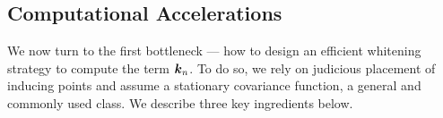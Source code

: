 \subsection{Computational Accelerations}
\label{sec:computational}
We now turn to the first bottleneck --- how to design an efficient whitening strategy
to compute the term $\boldsymbol{k}_n$. %
To do so,
we rely on judicious placement of inducing points and assume a stationary
covariance function, a general and commonly used class.
We describe three key ingredients below.




\iffalse
A symmetric Toeplitz matrix is a symmetric matrix that has \emph{constant
diagonals}. For a stationary kernel, the covariance matrix evaluated
at evenly-spaced grid points forms a symmetric Toeplitz matrix.
One-dimensional Toeplitz matrices have been used for GP \citep{cunningham2008fast},
and the multi-dimensional extension, which we term as the \emph{hierarchical Toeplitz structure},
is explored in \citet{wilson2015thoughts}.
\fi

